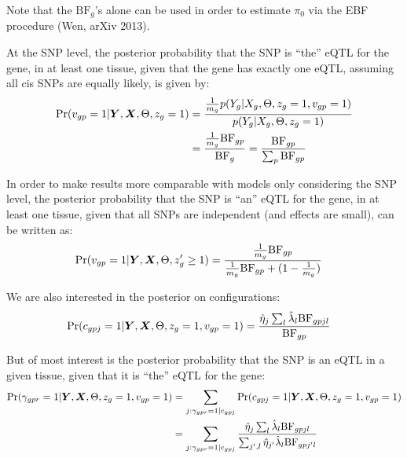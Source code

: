 \documentclass[10pt]{article}
\newcommand{\Prob}{\Pr} %
\newcommand{\BF}{{\text{BF}}} %
\newcommand{\Xv}{\mbox{\boldmath$X$}}
\newcommand{\Yv}{\mbox{\boldmath$Y$}}
\begin{document}
Note that the $\BF_g$'s alone can be used in order to estimate $\pi_0$ via the EBF procedure (Wen, arXiv 2013).

At the SNP level, the posterior probability that the SNP is ``the'' eQTL for the gene, in at least one tissue, given that the gene has exactly one eQTL, assuming all cis SNPs are equally likely, is given by:
\begin{equation}
  \begin{aligned}
    \Prob(v_{gp} = 1 | \Yv, \Xv, \Theta, z_g = 1) &= \frac{\frac{1}{m_g} p(Y_g | X_g, \Theta, z_g=1, v_{gp}=1)}{p(Y_g | X_g, \Theta, z_g = 1)} \\
    &= \frac{\frac{1}{m_g} \BF_{gp}}{\BF_g} = \frac{\BF_{gp}}{\sum_p \BF_{gp}}
  \end{aligned}
\end{equation}

In order to make results more comparable with models only considering the SNP level, the posterior probability that the SNP is ``an'' eQTL for the gene, in at least one tissue, given that all SNPs are independent (and effects are small), can be written as:
\begin{equation}
  \begin{aligned}
    \Prob(v_{gp} = 1 | \Yv, \Xv, \Theta, z'_g \ge 1) &= \frac{\frac{1}{m_g} \BF_{gp}}{\frac{1}{m_g} \BF_{gp} + (1-\frac{1}{m_g})}
  \end{aligned}
\end{equation}

We are also interested in the posterior on configurations:
\begin{equation}
  \begin{aligned}
    \Prob(c_{gpj} = 1 | \Yv, \Xv, \Theta, z_g = 1, v_{gp} = 1) &= \frac{\hat{\eta}_j \sum_l \hat{\lambda}_l \BF_{gpjl}}{\BF_{gp}}
  \end{aligned}
\end{equation}

But of most interest is the posterior probability that the SNP is an eQTL in a given tissue, given that it is ``the'' eQTL for the gene:
\begin{equation}
  \begin{aligned}
    \Prob(\gamma_{gpr} = 1 | \Yv, \Xv, \Theta, z_g = 1, v_{gp} = 1) &= \sum_{j:\gamma_{gpr}=1|c_{gpj}} \Prob(c_{gpj} = 1 | \Yv, \Xv, \Theta, z_g = 1, v_{gp} = 1) \\
    &= \sum_{j:\gamma_{gpr}=1 | c_{gpj}} \frac{\hat{\eta}_j \sum_l \hat{\lambda}_l \BF_{gpjl}}{\sum_{j',l} \hat{\eta}_{j'} \hat{\lambda}_l \BF_{gpj'l}}
  \end{aligned}
\end{equation}
\end{document}
